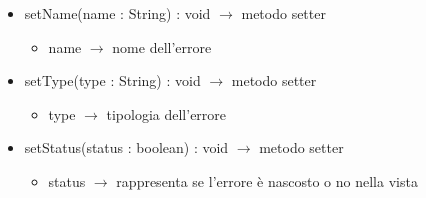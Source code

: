 \begin{description}
\begin{itemize}
	\item setName(name : String) : void $\rightarrow$ metodo setter\begin{itemize}
		\item name $\rightarrow$ nome dell'errore
	\end{itemize}
	
	\item setType(type : String) : void $\rightarrow$ metodo setter\begin{itemize}
		\item type $\rightarrow$ tipologia dell'errore
	\end{itemize}
	
	\item setStatus(status : boolean) : void $\rightarrow$ metodo setter\begin{itemize}
		\item status $\rightarrow$ rappresenta se l'errore è nascosto o no nella vista
	\end{itemize}
	
\end{itemize}

\end{description}

\vspace{0.5cm}
